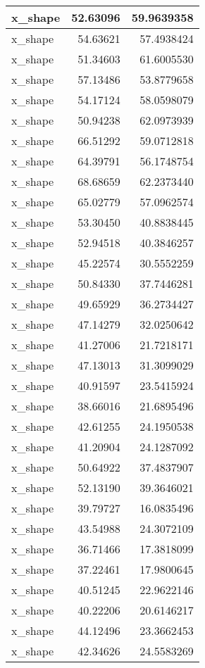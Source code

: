 \documentclass[
]{book}
\theoremstyle{definition}
\theoremstyle{definition}
\theoremstyle{definition}
\theoremstyle{definition}
\theoremstyle{remark}
\begin{document}
\begin{tabular}{l|r|r}
\hline
x\_shape & 52.63096 & 59.9639358\\
\hline
x\_shape & 54.63621 & 57.4938424\\
\hline
x\_shape & 51.34603 & 61.6005530\\
\hline
x\_shape & 57.13486 & 53.8779658\\
\hline
x\_shape & 54.17124 & 58.0598079\\
\hline
x\_shape & 50.94238 & 62.0973939\\
\hline
x\_shape & 66.51292 & 59.0712818\\
\hline
x\_shape & 64.39791 & 56.1748754\\
\hline
x\_shape & 68.68659 & 62.2373440\\
\hline
x\_shape & 65.02779 & 57.0962574\\
\hline
x\_shape & 53.30450 & 40.8838445\\
\hline
x\_shape & 52.94518 & 40.3846257\\
\hline
x\_shape & 45.22574 & 30.5552259\\
\hline
x\_shape & 50.84330 & 37.7446281\\
\hline
x\_shape & 49.65929 & 36.2734427\\
\hline
x\_shape & 47.14279 & 32.0250642\\
\hline
x\_shape & 41.27006 & 21.7218171\\
\hline
x\_shape & 47.13013 & 31.3099029\\
\hline
x\_shape & 40.91597 & 23.5415924\\
\hline
x\_shape & 38.66016 & 21.6895496\\
\hline
x\_shape & 42.61255 & 24.1950538\\
\hline
x\_shape & 41.20904 & 24.1287092\\
\hline
x\_shape & 50.64922 & 37.4837907\\
\hline
x\_shape & 52.13190 & 39.3646021\\
\hline
x\_shape & 39.79727 & 16.0835496\\
\hline
x\_shape & 43.54988 & 24.3072109\\
\hline
x\_shape & 36.71466 & 17.3818099\\
\hline
x\_shape & 37.22461 & 17.9800645\\
\hline
x\_shape & 40.51245 & 22.9622146\\
\hline
x\_shape & 40.22206 & 20.6146217\\
\hline
x\_shape & 44.12496 & 23.3662453\\
\hline
x\_shape & 42.34626 & 24.5583269\\

\end{tabular}
\end{document}
